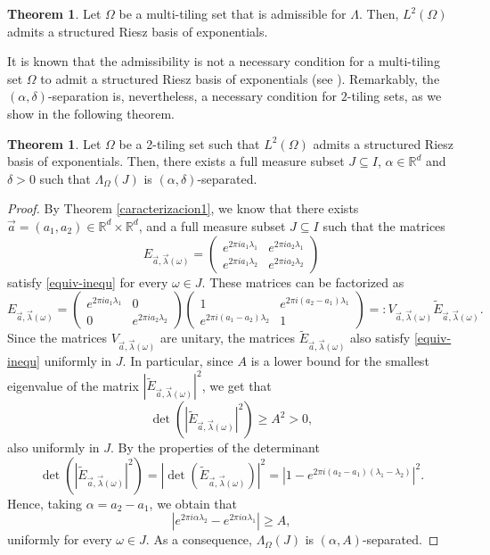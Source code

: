 \documentclass[a4paper,11pt]{amsart}
\theoremstyle{definition}
\newtheorem{teo}[fed]{Theorem}
\theoremstyle{definition}
\def\bdem{\begin{proof}}
\def\edem{\end{proof}}
\def\la{\lambda}
\def\La{\Lambda}
\def\w{\omega}
\def\W{\Omega}
\def\R{\mathbb{R}}
\begin{document}
\begin{teo}
	Let $\W$ be a multi-tiling set that is admissible for $\La$. Then, $L^2(\W)$ admits a structured Riesz basis of exponentials.
\end{teo}


It is known that the admissibility is not a necessary condition for a multi-tiling set $\Omega$ to admit a structured Riesz basis of exponentials (see \cite[Example 3.3]{CC}). Remarkably, the $(\alpha,\delta)$-separation is, nevertheless, a necessary condition for $2$-tiling sets, as we show in the following theorem.

\begin{teo}\label{necesario para 2tilings}
	Let $\W$ be a 2-tiling set such that $L^2(\W)$ admits a structured Riesz basis of exponentials. Then, there exists a full measure subset $J\subseteq I$, $ \alpha \in \R^d$ and $\delta>0$ such that $\La_\W(J)$ is $( \alpha,\delta)$-separated.
\end{teo}
\bdem
By Theorem \ref{caracterizacion1}, we know that there exists $\vec{a}=(a_1,a_2)\in \R^d\times\R^d$, and a full measure subset $J\subseteq I$ such that the matrices 
$$
E_{\vec{a},\vec{\la}(\w)}=\begin{pmatrix}
	e^{2\pi i a_1  \la_1} & e^{2\pi i a_2 \la_1}  \\
	
	e^{2\pi i a_1 \la_2}& e^{2\pi i a_2 \la_2}
\end{pmatrix}
$$
satisfy \eqref{equiv-inequ} for every $\w\in J$. These matrices can be factorized as
$$
E_{\vec{a},\vec{\la}(\w)}=\begin{pmatrix}
	e^{2\pi i a_1  \la_1} & 0  \\
	
	0& e^{2\pi i a_2 \la_2}
\end{pmatrix}
\begin{pmatrix}
	1& e^{2\pi i (a_2-a_1) \la_1}  \\			
	e^{2\pi i (a_1-a_2) \la_2}& 1
\end{pmatrix}
=:V_{\vec{a},\vec{\la}(\w)}  \widetilde{E}_{\vec{a},\vec{\la}(\w)}.
$$
Since the matrices $V_{\vec{a},\vec{\la}(\w)}$ are unitary, the matrices $ \widetilde{E}_{\vec{a},\vec{\la}(\w)}$ also satisfy \eqref{equiv-inequ}  uniformly in $J$. In particular, since $A$ is a lower bound for the smallest eigenvalue of the matrix  $|\widetilde{E}_{\vec{a},\vec{\la}(\w)}|^2$, we get that
$$
\det\left(\left| \widetilde{E}_{\vec{a},\vec{\la}(\w)}\right|^2\right)\geq A^2>0,
$$
also uniformly in $J$. By the properties of the determinant
$$
\det\left(\left| \widetilde{E}_{\vec{a},\vec{\la}(\w)}\right|^2\right)=\left|\det\left( \widetilde{E}_{\vec{a},\vec{\la}(\w)}\right)\right|^2=\left|1-e^{2\pi i (a_2-a_1)(\la_1-\la_2)}\right|^2.
$$
Hence, taking $ \alpha=a_2-a_1$, we obtain that 
$$
\left|e^{2\pi i  \alpha  \la_2}-e^{2\pi i  \alpha  \la_1}\right|\geq A,
$$
uniformly for every $\w\in J$. As a consequence, $\La_\W(J)$ is $( \alpha,A)$-separated.
\edem
\end{document}
